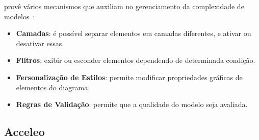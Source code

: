 \sirius provê vários mecanismos que auxiliam no gerenciamento da complexidade de modelos~\cite{madiot2015eclipse}:

\begin{itemize}
	\item \textbf{Camadas}: é possível separar elementos em camadas diferentes, e ativar ou desativar essas.
	\item \textbf{Filtros}: exibir ou esconder elementos dependendo de determinada condição.
	\item \textbf{Fersonalização de Estilos}: permite modificar propriedades gráficas de elementos do diagrama.
	\item \textbf{Regras de Validação}: permite que a qualidade do modelo seja avaliada.
\end{itemize}

\subsection{Acceleo}



